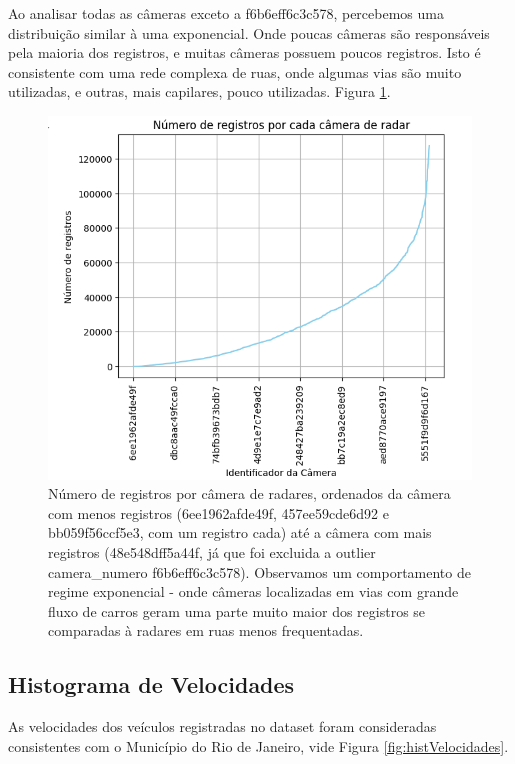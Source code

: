 \documentclass{article}
\begin{document}
Ao analisar todas as câmeras exceto a f6b6eff6c3c578, percebemos uma distribuição similar à uma exponencial. Onde poucas câmeras são responsáveis pela maioria dos registros, e muitas câmeras possuem poucos registros. Isto é consistente com uma rede complexa de ruas, onde algumas vias são muito utilizadas, e outras, mais capilares, pouco utilizadas. Figura \ref{fig:lineCameraNumeroInverted}.

\begin{figure}
    \centering
    \includegraphics[width=0.75\linewidth]{lineCameraNumeroInverted.png}
    \caption{Número de registros por câmera de radares, ordenados da câmera com menos registros (6ee1962afde49f, 457ee59cde6d92 e bb059f56ccf5e3, com um registro cada) até a câmera com mais registros (48e548dff5a44f, já que foi excluida a outlier camera\_numero f6b6eff6c3c578). Observamos um comportamento de regime exponencial - onde câmeras localizadas em vias com grande fluxo de carros geram uma parte muito maior dos registros se comparadas à radares em ruas menos frequentadas.}
    \label{fig:lineCameraNumeroInverted}
\end{figure}
\subsection{Histograma de Velocidades}

As velocidades dos veículos registradas no dataset foram consideradas consistentes com o Município do Rio de Janeiro, vide Figura \ref{fig:histVelocidades}.
\end{document}
